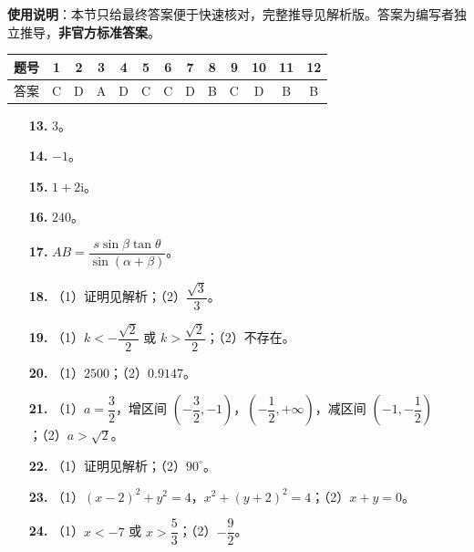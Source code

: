 
\begin{gknotice}
\textbf{使用说明}：本节只给最终答案便于快速核对，完整推导见解析版。答案为编写者独立推导，\textbf{非官方标准答案}。
\end{gknotice}

\begin{center}\begin{tabular}{ccccccccccccc}
\toprule
题号 & 1 & 2 & 3 & 4 & 5 & 6 & 7 & 8 & 9 & 10 & 11 & 12 \\
\midrule
答案 & C & D & A & D & C & C & D & B & C & D & B & B \\
\bottomrule
\end{tabular}\end{center}

\begin{itemize}[leftmargin=2.6em]
  \item[\textbf{13.}] $3$。
  \item[\textbf{14.}] $-1$。
  \item[\textbf{15.}] $1+2\mathrm i$。
  \item[\textbf{16.}] $240$。
\end{itemize}

\begin{itemize}[leftmargin=2.6em]
  \item[\textbf{17.}] $AB=\dfrac{s\sin\beta\tan\theta}{\sin(\alpha+\beta)}$。
  \item[\textbf{18.}] （1）证明见解析；（2）$\dfrac{\sqrt3}{3}$。
  \item[\textbf{19.}] （1）$k<-\dfrac{\sqrt2}{2}$ 或 $k>\dfrac{\sqrt2}{2}$；（2）不存在。
  \item[\textbf{20.}] （1）$2500$；（2）$0.9147$。
  \item[\textbf{21.}] （1）$a=\dfrac32$，增区间 $\left(-\dfrac32,-1\right)$，$\left(-\dfrac12,+\infty\right)$，减区间 $\left(-1,-\dfrac12\right)$；（2）$a>\sqrt2$。
  \item[\textbf{22.}] （1）证明见解析；（2）$90^\circ$。
\end{itemize}

\begin{itemize}[leftmargin=2.6em]
  \item[\textbf{23.}] （1）$(x-2)^2+y^2=4$，$x^2+(y+2)^2=4$；（2）$x+y=0$。
  \item[\textbf{24.}] （1）$x<-7$ 或 $x>\dfrac53$；（2）$-\dfrac92$。
\end{itemize}

